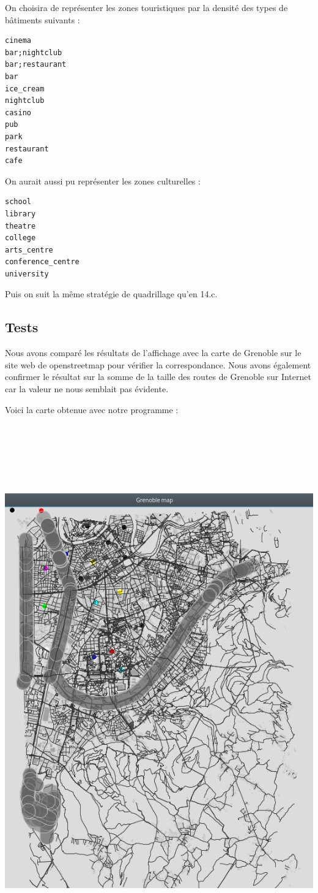 \documentclass[12pt,a4paper]{article}
\begin{document}
On choisira de représenter les zones touristiques par la densité des types de
bâtiments suivants :

\begin{lstlisting}
cinema
bar;nightclub
bar;restaurant
bar
ice_cream
nightclub
casino
pub
park
restaurant
cafe
\end{lstlisting}

On aurait aussi pu représenter les zones culturelles :

\begin{lstlisting}
school
library
theatre
college
arts_centre
conference_centre
university
\end{lstlisting}

Puis on suit la même stratégie de quadrillage qu'en 14.c.

\subsection*{Tests}

Nous avons comparé les résultats de l'affichage avec la carte de Grenoble sur le site web de openstreetmap pour vérifier la correspondance. Nous avons également confirmer le résultat sur la somme de la taille des routes de Grenoble sur Internet car la valeur ne nous semblait pas évidente.

\newpage
Voici la carte obtenue avec notre programme :

\includegraphics[height=23cm]{map.png}
\end{document}
